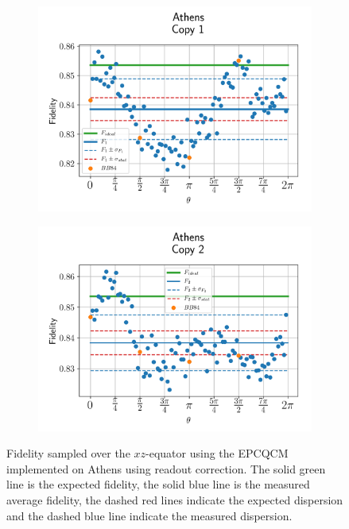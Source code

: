 \begin{figure}[H]
  \centering
  \begin{subfigure}{.5\textwidth}
    \centering
    \includegraphics[width=\textwidth]{Figures/Economical/IBM/OnlyEquator/results_athens_copy1.png}
    \label{fig:epc_uncorrected_athens_equator_1}
  \end{subfigure}%
  \begin{subfigure}{.5\textwidth}
    \centering
    \includegraphics[width=\textwidth]{Figures/Economical/IBM/OnlyEquator/results_athens_copy2.png}
    \label{fig:epc_uncorrected_athens_equator_2}
  \end{subfigure}
  \vspace{-0.5cm}
  \caption{Fidelity sampled over the $xz$-equator using the EPCQCM implemented on Athens using readout correction. The solid green line is the expected fidelity, the solid blue line is the measured average fidelity, the dashed red lines indicate the expected dispersion and the dashed blue line indicate the measured dispersion.}
  \label{fig:epc_uncorrected_athens_equator}
\end{figure}

